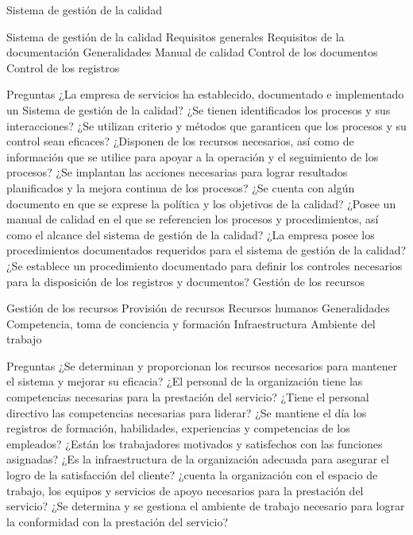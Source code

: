 \documentclass[10pt,a4paper]{article}
\begin{document}
\begin{enumerate}
 


Sistema de gestión de la calidad

Sistema de gestión de la calidad
Requisitos generales
Requisitos de la documentación
Generalidades
Manual de calidad
Control de los documentos
Control de los registros

Preguntas
¿La empresa de servicios ha establecido, documentado e implementado un Sistema de gestión de la calidad? 
¿Se tienen identificados los procesos y sus interacciones?
¿Se utilizan criterio y métodos que garanticen que los procesos y su control sean eficaces?
¿Disponen de los recursos necesarios, así como de información que se utilice para apoyar a la operación y el seguimiento de los procesos?
¿Se implantan las acciones necesarias para lograr resultados planificados y la mejora continua de los procesos? 
¿Se cuenta con algún documento en que se exprese la política y los objetivos de la calidad?
¿Posee un manual de calidad en el que se referencien los procesos y procedimientos, así como el alcance del sistema de gestión de la calidad?
¿La empresa posee los procedimientos documentados requeridos para el sistema de gestión de la calidad?
¿Se establece un procedimiento documentado para definir los controles necesarios para la disposición de los registros y documentos? 
Gestión de los recursos

Gestión de los recursos 
Provisión de recursos
Recursos humanos
Generalidades
Competencia, toma de conciencia y formación
Infraestructura
Ambiente del trabajo

Preguntas
¿Se determinan y proporcionan los recursos necesarios para mantener el sistema y mejorar su eficacia?
¿El personal de la organización tiene las competencias necesarias para la prestación del servicio?
¿Tiene el personal directivo las competencias necesarias para liderar?
¿Se mantiene el día los registros de formación, habilidades, experiencias y competencias de los empleados?
¿Están los trabajadores motivados y satisfechos con las funciones asignadas?
¿Es la infraestructura de la organización adecuada para asegurar el logro de la satisfacción del cliente?
¿cuenta la organización con el espacio de trabajo, los equipos y servicios de apoyo necesarios para la prestación del servicio?
¿Se determina y se gestiona el ambiente de trabajo necesario para lograr la conformidad con la prestación del servicio?


\end{enumerate}
\end{document}
